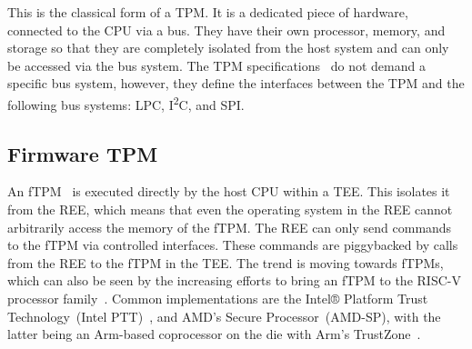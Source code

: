 This is the classical form of a TPM\@.
It is a dedicated piece of hardware, connected to the CPU via a bus.
They have their own processor, memory, and storage so that they are completely isolated from the host system and can only be accessed via the bus system.
The TPM specifications~\cite{tpm, tcgPcClient} do not demand a specific bus system, however, they define the interfaces between the TPM and the following bus systems: LPC, I\textsuperscript{2}C, and SPI\@.


\subsection{Firmware TPM}



An fTPM~\cite{Raj2015, 197213} is executed directly by the host CPU within a \ac{TEE}.
This isolates it from the \ac{REE}, which means that even the operating system in the REE cannot arbitrarily access the memory of the fTPM\@.
The \ac{REE} can only send commands to the fTPM via controlled interfaces.
These commands are piggybacked by calls from the \ac{REE} to the fTPM in the \ac{TEE}.
The trend is moving towards fTPMs, which can also be seen by the increasing efforts to bring an fTPM to the RISC-V processor family~\cite{Boubakri2021}.
Common implementations are the Intel® Platform Trust Technology~(Intel PTT)~\cite{intelProcessorSecurity}, and AMD's Secure Processor~(AMD-SP), with the latter being an Arm-based coprocessor on the die with Arm's TrustZone~\cite{Khalid2020}.


